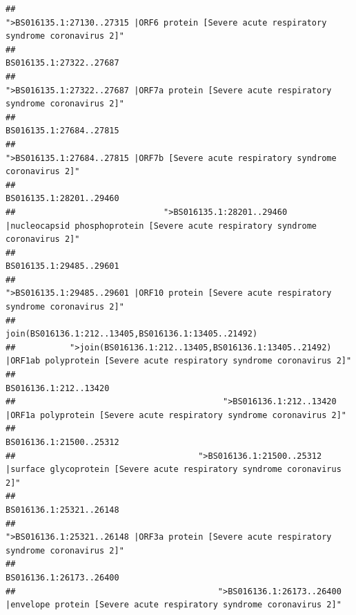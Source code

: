 \documentclass[
]{article}
\begin{document}
\begin{verbatim}
##                                             ">BS016135.1:27130..27315 |ORF6 protein [Severe acute respiratory syndrome coronavirus 2]" 
##                                                                                                                BS016135.1:27322..27687 
##                                            ">BS016135.1:27322..27687 |ORF7a protein [Severe acute respiratory syndrome coronavirus 2]" 
##                                                                                                                BS016135.1:27684..27815 
##                                                    ">BS016135.1:27684..27815 |ORF7b [Severe acute respiratory syndrome coronavirus 2]" 
##                                                                                                                BS016135.1:28201..29460 
##                              ">BS016135.1:28201..29460 |nucleocapsid phosphoprotein [Severe acute respiratory syndrome coronavirus 2]" 
##                                                                                                                BS016135.1:29485..29601 
##                                            ">BS016135.1:29485..29601 |ORF10 protein [Severe acute respiratory syndrome coronavirus 2]" 
##                                                                                    join(BS016136.1:212..13405,BS016136.1:13405..21492) 
##           ">join(BS016136.1:212..13405,BS016136.1:13405..21492) |ORF1ab polyprotein [Severe acute respiratory syndrome coronavirus 2]" 
##                                                                                                                  BS016136.1:212..13420 
##                                          ">BS016136.1:212..13420 |ORF1a polyprotein [Severe acute respiratory syndrome coronavirus 2]" 
##                                                                                                                BS016136.1:21500..25312 
##                                     ">BS016136.1:21500..25312 |surface glycoprotein [Severe acute respiratory syndrome coronavirus 2]" 
##                                                                                                                BS016136.1:25321..26148 
##                                            ">BS016136.1:25321..26148 |ORF3a protein [Severe acute respiratory syndrome coronavirus 2]" 
##                                                                                                                BS016136.1:26173..26400 
##                                         ">BS016136.1:26173..26400 |envelope protein [Severe acute respiratory syndrome coronavirus 2]" 

\end{verbatim}
\end{document}
